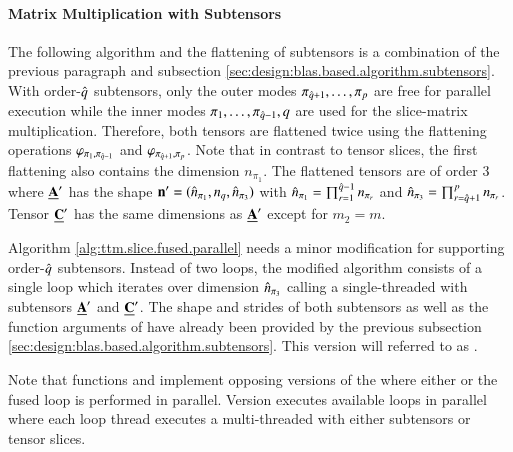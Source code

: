 \paragraph{Matrix Multiplication with Subtensors}
The following algorithm and the flattening of subtensors is a combination of the previous paragraph and subsection \ref{sec:design:blas.based.algorithm.subtensors}.
With order-$\hat{q}$ subtensors, only the outer modes $\pi_{\hat{q}+1},\dots,\pi_{p}$ are free for parallel execution while the inner modes $\pi_{1},\dots,\pi_{\hat{q}-1},q$ are used for the slice-matrix multiplication.
Therefore, both tensors are flattened twice using the flattening operations $\varphi_{\pi_{1},\pi_{\hat{q}-1}}$ and $\varphi_{\pi_{\hat{q}+1},\pi_p}$. 
Note that in contrast to tensor slices, the first flattening also contains the dimension $n_{\pi_{1}}$.
The flattened tensors are of order $3$ where $\underline{\mathbf{A}}'$ has the shape $\mathbf{n}'=(\hat{n}_{\pi_1},n_{q},\hat{n}_{\pi_3})$ with $\hat{n}_{\pi_1} = \prod_{r=1}^{\hat{q}-1} n_{\pi_r}$ and $\hat{n}_{\pi_3} = \prod_{r=\hat{q}+1}^{p} n_{\pi_r}$.
Tensor $\underline{\mathbf{C}}'$ has the same dimensions as $\underline{\mathbf{A}}'$ except for $m_2=m$.

Algorithm \ref{alg:ttm.slice.fused.parallel} needs a minor modification  for supporting order-$\hat{q}$ subtensors.
Instead of two loops, the modified algorithm consists of a single loop which iterates over dimension $\hat{n}_{\pi_3}$ calling a single-threaded  with subtensors $\underline{\mathbf{A}}'$ and $\underline{\mathbf{C}}'$.
The shape and strides of both subtensors as well as the function arguments of  have already been provided by the previous subsection \ref{sec:design:blas.based.algorithm.subtensors}.
This  version will referred to as \allowbreak{}.

Note that functions  and  implement opposing versions of the  where either  or the fused loop is performed in parallel.
Version  executes available loops in parallel where each loop thread executes a multi-threaded  with either subtensors or tensor slices.


